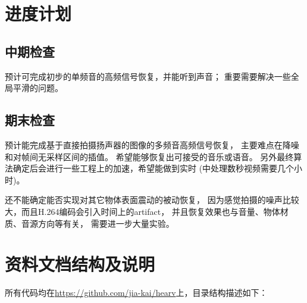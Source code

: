 
\section{进度计划}

\subsection{中期检查}
预计可完成初步的单频音的高频信号恢复，并能听到声音；
重要需要解决一些全局平滑的问题。

\subsection{期末检查}

预计能完成基于直接拍摄扬声器的图像的多频音高频信号恢复，
主要难点在降噪和对帧间无采样区间的插值。
希望能够恢复出可接受的音乐或语音。
另外最终算法确定后会进行一些工程上的加速，希望能做到实时
(\cite{Davis2014VisualMic}中处理数秒视频需要几个小时)。

还不能确定能否实现对其它物体表面震动的被动恢复，
因为感觉拍摄的噪声比较大，而且H.264编码会引入时间上的artifact，
并且恢复效果也与音量、物体材质、音源方向等有关，
需要进一步大量实验。


\section{资料文档结构及说明}
所有代码均在\url{https://github.com/jia-kai/hearv}上，目录结构描述如下：


